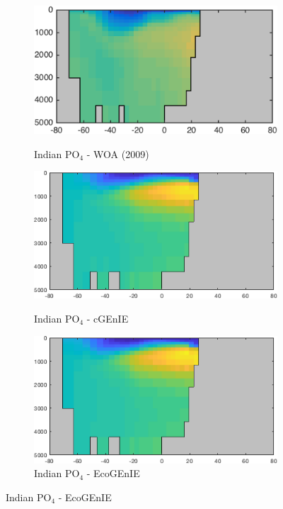 \documentclass{article}
\begin{document}
\begin{figure}[htp]
\begin{subfigure}{.33\textwidth}
 \label{fig:nutrients2}
\end{subfigure}
\begin{subfigure}{.33\textwidth}
 \caption{Indian PO$_4$ - WOA (2009)}
 \includegraphics[width=0.95\linewidth]{../Separate_figures/OBSERVATIONS/Indian_p_an_profile.png}
 \label{fig:nutrients1}
\end{subfigure}%
\begin{subfigure}{.33\textwidth}
 \caption{Indian PO$_4$ - cGEnIE}
 \includegraphics[width=0.95\linewidth]{../Separate_figures/BIOGEM/Indian_ocn_PO4_profile.png}
 \label{fig:nutrients1}
\end{subfigure}%
\begin{subfigure}{.33\textwidth}
 \caption{Indian PO$_4$ - EcoGEnIE}
 \includegraphics[width=0.95\linewidth]{../Separate_figures/ECOGEM/Indian_ocn_PO4_profile.png}

\end{subfigure}
\end{figure}
\end{document}
